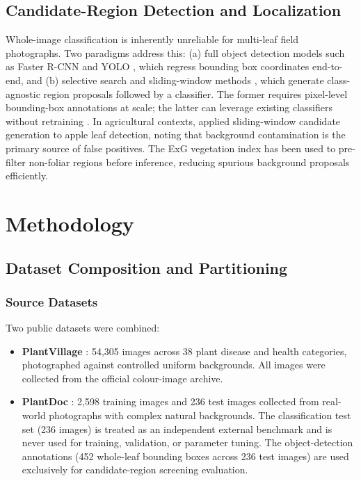 \documentclass[pdflatex,sn-mathphys-num]{sn-jnl}
\begin{document}
\subsection{Candidate-Region Detection and Localization}

Whole-image classification is inherently unreliable for multi-leaf field photographs.
Two paradigms address this: (a) full object detection models such as Faster R-CNN
\citep{ren2015fasterrcnn} and YOLO \citep{redmon2016yolo}, which regress bounding box
coordinates end-to-end, and (b) selective search and sliding-window methods
\citep{barbedo2019factors}, which generate class-agnostic region proposals followed by
a classifier. The former requires pixel-level bounding-box annotations at scale; the
latter can leverage existing classifiers without retraining \citep{he2019multiscale}.
In agricultural contexts, \citet{jiang2020realtime} applied sliding-window candidate
generation to apple leaf detection, noting that background contamination is the
primary source of false positives. The ExG vegetation index \citep{woebbecke1995color}
has been used to pre-filter non-foliar regions before inference, reducing spurious
background proposals efficiently.


\section{Methodology}
\label{sec:methodology}

\subsection{Dataset Composition and Partitioning}
\label{sec:dataset}

\subsubsection{Source Datasets}

Two public datasets were combined:
\begin{itemize}
  \item \textbf{PlantVillage} \citep{hughes2015plantvillage}: 54{,}305 images across
        38 plant disease and health categories, photographed against controlled uniform
        backgrounds. All images were collected from the official colour-image archive.
  \item \textbf{PlantDoc} \citep{singh2020plant}: 2{,}598 training images and 236 test
        images collected from real-world photographs with complex natural backgrounds.
        The classification test set (236 images) is treated as an independent external
        benchmark and is never used for training, validation, or parameter tuning.
        The object-detection annotations (452 whole-leaf bounding boxes across 236 test
        images) are used exclusively for candidate-region screening evaluation.
\end{itemize}
\end{document}
